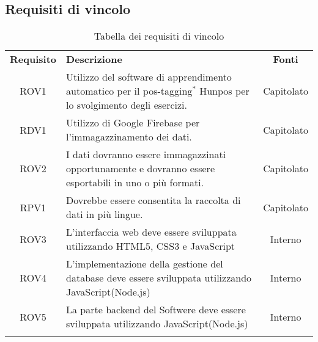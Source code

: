\subsection{Requisiti di vincolo}
\begin{longtable}{| c | p{10cm} | c |}
		\rowcolor{LightBlue}
		\color{white}\bfseries Requisito & \color{white}\bfseries Descrizione & \color{white}\bfseries Fonti\\[0.25cm]
		ROV1 & Utilizzo del software di apprendimento automatico per il pos-tagging$^*$ Hunpos per lo svolgimento degli esercizi. & Capitolato \\
		RDV1 & Utilizzo di Google Firebase per l'immagazzinamento dei dati. & Capitolato \\
		ROV2 & I dati dovranno essere immagazzinati opportunamente e dovranno essere esportabili in uno o più formati. & Capitolato \\
		RPV1 & Dovrebbe essere consentita la raccolta di dati in più lingue. & Capitolato \\ 
		ROV3 & L’interfaccia web deve essere sviluppata utilizzando HTML5, CSS3 e JavaScript & Interno\\
		ROV4 & L'implementazione della gestione del database deve essere sviluppata utilizzando JavaScript(Node.js) & Interno\\
		ROV5 & La parte backend del Softwere deve essere sviluppata utilizzando JavaScript(Node.js) & Interno\\
		\hline
		\caption{Tabella dei requisiti di vincolo}
\end{longtable}

